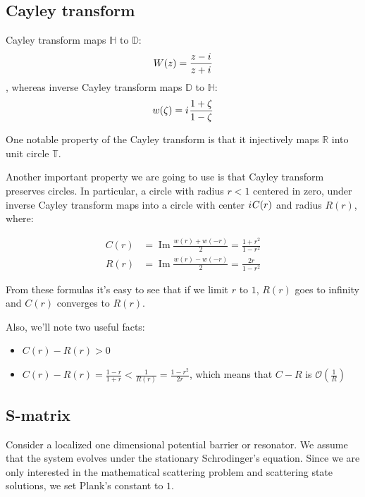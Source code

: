 \documentclass{gCOV2e}
\theoremstyle{plain}%
\theoremstyle{definition}
\theoremstyle{remark}
\newcommand{\mcO}{\mathcal{O}} %
\newcommand{\iu}{{i\mkern1mu}} %
\renewcommand{\Im}{\operatorname{Im}}
\begin{document}
\subsection{Cayley transform}

Cayley transform maps $\mathbb{H}$ to $\mathbb{D}$:
\begin{equation}\label{eq:cayley}
W(z) = \frac{z - \iu}{z + \iu}
\end{equation}
, whereas inverse Cayley transform maps $\mathbb{D}$ to $\mathbb{H}$:
\begin{equation}\label{eq:cayley_inverse}
w(\zeta) = \iu \frac{1 + \zeta}{1 - \zeta}
\end{equation}

One notable property of the Cayley transform is that it injectively maps $\mathbb{R}$ into unit circle $\mathbb{T}$.

Another important property we are going to use is that Cayley transform preserves circles. In particular, a circle with radius $r < 1$ centered in zero, under inverse Cayley transform maps into a circle with center $\iu C(r)$ and radius $R(r)$, where:

\begin{equation}\label{eq:c_and_r}
\begin{aligned}
   C(r) &= \Im \frac{w(r) + w(-r)}{2} = \frac{1 + r^2}{1 - r^2}
\\ R(r) &= \Im \frac{w(r) - w(-r)}{2} = \frac{2 r}{1 - r^2}
\end{aligned}
\end{equation}

From these formulas it's easy to see that if we limit $r$ to $1$, $R(r)$ goes to infinity and $C(r)$ converges to $R(r)$.

Also, we'll note two useful facts:
\begin{itemize}
\item $C(r) - R(r) > 0$
\item $C(r) - R(r) = \frac{1 - r}{1 + r} < \frac{1}{R(r)} = \frac{1 - r^2}{2 r}$, which means that $C - R$ is $\mcO(\frac{1}{R})$
\end{itemize}

\subsection{S-matrix}\label{sec:smatrix}
Consider a localized one dimensional potential barrier or resonator. We assume that the system evolves under the stationary Schrodinger's equation. Since we are only interested in the mathematical scattering problem and scattering state solutions, we set Plank's constant to $1$.
\end{document}
